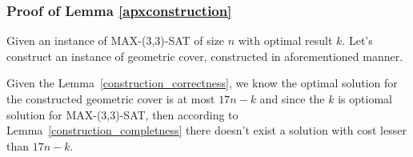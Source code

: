 \subsubsection{Proof of Lemma \ref{apxconstruction}}
Given an instance of MAX-(3,3)-SAT of size $n$
with optimal result $k$.
Let's construct an instance of geometric cover,
constructed in aforementioned manner.

Given the Lemma~\ref{construction_correctness}, we know
the optimal solution for the constructed geometric cover is
at most $17n - k$ and since the $k$ is optiomal solution
for MAX-(3,3)-SAT, then according to Lemma~\ref{construction_completness}
there doesn't exist a solution with cost lesser than $17n - k$.
